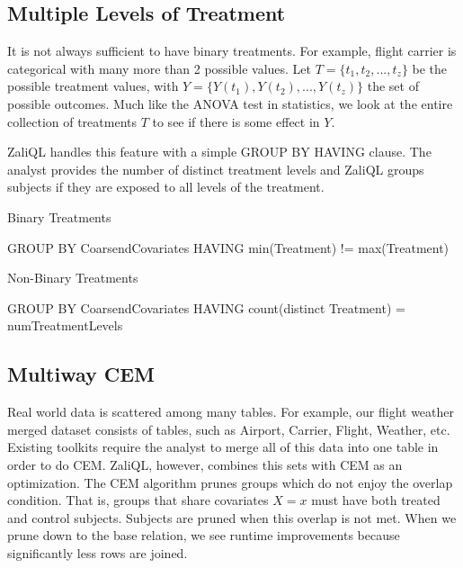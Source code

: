 
\subsection{Multiple Levels of Treatment}
\label{sec:baserel}

It is not always sufficient to have binary treatments.
For example, flight carrier is categorical with many more than 2 possible values.
Let $T = \{t_1, t_2,...,t_z\}$ be the possible treatment values, with 
$Y = \{Y(t_1), Y(t_2),...,Y(t_z)\}$ the set of possible outcomes.
Much like the ANOVA test in statistics, we look at the entire collection of treatments $T$
to see if there is some effect in $Y$.




ZaliQL handles this feature with a simple GROUP BY HAVING clause.
The analyst provides the number of distinct treatment levels and ZaliQL 
groups subjects if they are exposed to all levels of the treatment.

\begin{algorithm} \small
\caption{Binary Treatments} \label{alg:havingtreatments}
GROUP BY CoarsendCovariates \newline
HAVING min(Treatment) != max(Treatment)
\end{algorithm}
\begin{algorithm} \small
\caption{Non-Binary Treatments} \label{alg:havingtreatments}
GROUP BY CoarsendCovariates \newline
HAVING count(distinct Treatment) = numTreatmentLevels
\end{algorithm}


\subsection{Multiway CEM}
\label{sec:baserel}

Real world data is scattered among many tables. For example, our flight weather merged
dataset consists of tables, such as Airport, Carrier, Flight, Weather, etc.
Existing toolkits require the analyst to merge all of this data into one table in order to do CEM.
ZaliQL, however, combines this sets with CEM as an optimization.
The CEM algorithm prunes groups which do not enjoy the overlap condition.
That is, groups that share covariates $X=x$ must have both treated and control subjects.
Subjects are pruned when this overlap is not met.
When we prune down to the base relation, we see runtime improvements because significantly
less rows are joined.

